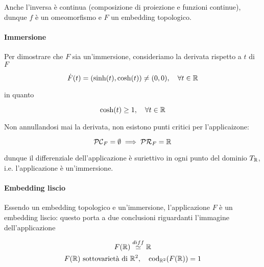 {Anche l'inversa è continua (composizione di proiezione e funzioni continue), dunque $ f $ è un omeomorfismo e $ F $ un embedding topologico.

\paragraph{Immersione}

Per dimostrare che $ F $ sia un'immersione, consideriamo la derivata rispetto a $ t $ di $ F $

\begin{equation}
	\dot{F}(t) = (\sinh(t),\cosh(t)) \neq (0,0) \qcomma \forall t \in \R
\end{equation}

in quanto

\begin{equation}
	\cosh(t) \geq 1 \qcomma \forall t \in \R
\end{equation}

Non annullandosi mai la derivata, non esistono punti critici per l'applicaizone:

\begin{equation}
	\mathcal{PC}_{F} = \emptyset \implies \mathcal{PR}_{F} = \mathbb{R}
\end{equation}

dunque il differenziale dell'applicazione è suriettivo in ogni punto del dominio $ T_{\mathbb{R}} $, i.e. l'applicazione è un'immersione.

\paragraph{Embedding liscio}

Essendo un embedding topologico e un'immersione, l'applicazione $ F $ è un embedding liscio: questo porta a due conclusioni riguardanti l'immagine dell'applicazione

\begin{gather}
	F(\R) \stackrel{diff}{\simeq} \R \\
	F(\R) \text{ sottovarietà di } \R^{2} \qcomma \operatorname{cod}_{\R^{2}} (F(\R)) = 1
\end{gather}
}


